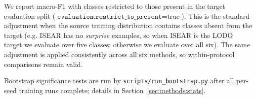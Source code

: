We report macro-F1 with classes restricted to those present in the
target evaluation split
($\texttt{evaluation.restrict\_to\_present}=\text{true}$). This is
the standard adjustment when the source training distribution
contains classes absent from the target (e.g. ISEAR has no
\emph{surprise} examples, so when ISEAR is the LODO target we evaluate
over five classes; otherwise we evaluate over all six). The same
adjustment is applied consistently across all six methods, so
within-protocol comparisons remain valid.

Bootstrap significance tests are run by
\texttt{scripts/run\_bootstrap.py} after all per-seed training runs
complete; details in Section~\ref{sec:methods:stats}.
